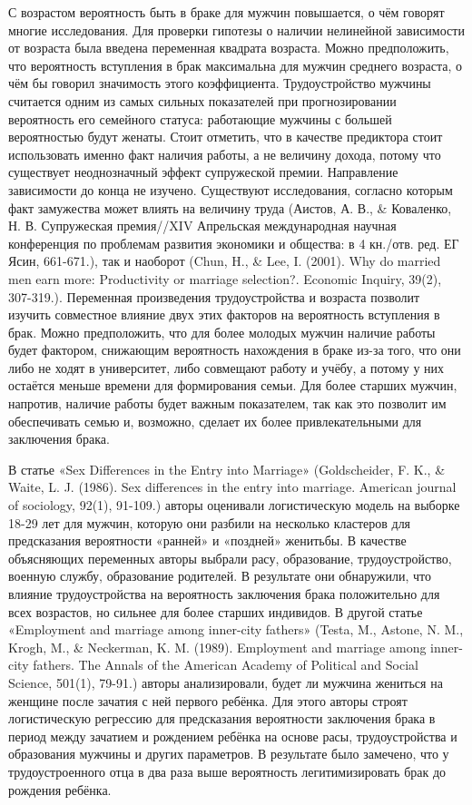 \documentclass[a4paper,12pt]{article}
\begin{document}
С возрастом вероятность быть в браке для мужчин повышается, о чём говорят многие исследования. Для проверки гипотезы о наличии нелинейной зависимости от возраста была введена переменная квадрата возраста. Можно предположить, что вероятность вступления в брак максимальна для мужчин среднего возраста, о чём бы говорил значимость этого коэффициента. Трудоустройство мужчины считается одним из самых сильных показателей при прогнозировании вероятность его семейного статуса: работающие мужчины с большей вероятностью будут женаты. Стоит отметить, что в качестве предиктора стоит использовать именно факт наличия работы, а не величину дохода, потому что существует неоднозначный эффект супружеской премии. Направление зависимости до конца не изучено. Существуют исследования, согласно которым факт замужества может влиять на величину труда (Аистов, А. В., \& Коваленко, Н. В. Супружеская премия//XIV Апрельская международная научная конференция по проблемам развития экономики и общества: в 4 кн./отв. ред. ЕГ Ясин, 661-671.), так и наоборот (Chun, H., \& Lee, I. (2001). Why do married men earn more: Productivity or marriage selection?. Economic Inquiry, 39(2), 307-319.). Переменная произведения трудоустройства и возраста позволит изучить совместное влияние двух этих факторов на вероятность вступления в брак. Можно предположить, что для более молодых мужчин наличие работы будет фактором, снижающим вероятность нахождения в браке из-за того, что они либо не ходят в университет, либо совмещают работу и учёбу, а потому у них остаётся меньше времени для формирования семьи. Для более старших мужчин, напротив, наличие работы будет важным показателем, так как это позволит им обеспечивать семью и, возможно, сделает их более привлекательными для заключения брака. 

В статье «Sex Differences in the Entry into Marriage» (Goldscheider, F. K., \& Waite, L. J. (1986). Sex differences in the entry into marriage. American journal of sociology, 92(1), 91-109.) авторы оценивали логистическую модель на выборке 18-29 лет для мужчин, которую они разбили на несколько кластеров для предсказания вероятности «ранней» и «поздней» женитьбы. В качестве объясняющих переменных авторы выбрали расу, образование, трудоустройство, военную службу, образование родителей. В результате они обнаружили, что влияние трудоустройства на вероятность заключения брака положительно для всех возрастов, но сильнее для более старших индивидов. В другой статье «Employment and marriage among inner-city fathers» (Testa, M., Astone, N. M., Krogh, M., \& Neckerman, K. M. (1989). Employment and marriage among inner-city fathers. The Annals of the American Academy of Political and Social Science, 501(1), 79-91.) авторы анализировали, будет ли мужчина жениться на женщине после зачатия с ней первого ребёнка. Для этого авторы строят логистическую регрессию для предсказания вероятности заключения брака в период между зачатием и рождением ребёнка на основе расы, трудоустройства и образования мужчины и других параметров. В результате было замечено, что у трудоустроенного отца в два раза выше вероятность легитимизировать брак до рождения ребёнка.
\end{document}

